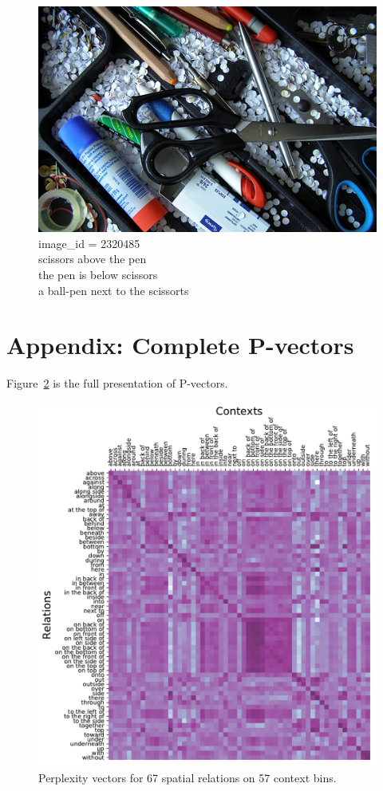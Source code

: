 \begin{figure}[h!]
	\centering
	\includegraphics[width=0.65\linewidth]{studies/splu2019/figures/2320485.jpg}
	\caption{
		image\_id = 2320485 \\
		scissors above the pen \\
		the pen is below scissors \\
		a ball-pen next to the scissorts}\label{splu2019:fig:examples2}%
\end{figure}

\pagebreak
\section{Appendix: Complete P-vectors}\label{splu2019:sec:appendix_plots}
Figure~\ref{splu2019:fig:matrix} is the full presentation of P-vectors.
\begin{figure}[h!]
	\begin{center}
		\includegraphics[width=0.9\linewidth]{studies/splu2019/figures/overall_matrix57x63.pdf}
		\caption{Perplexity vectors for 67 spatial relations on 57 context bins.}
		\label{splu2019:fig:matrix}
	\end{center}
\end{figure}

